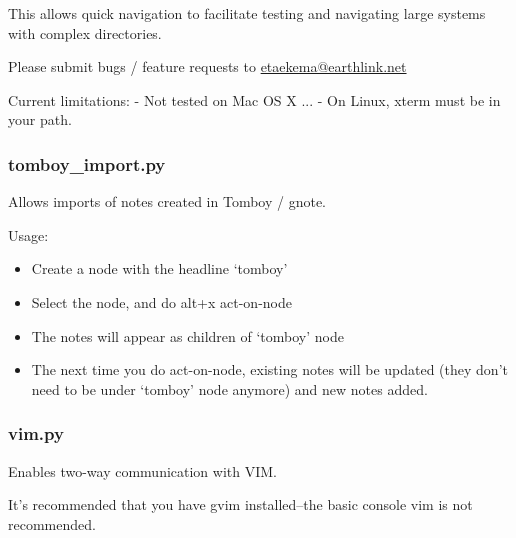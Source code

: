 \documentclass[a4paper,10pt,english]{sphinxmanual}
\begin{document}
This allows quick navigation to facilitate testing and navigating large systems
with complex directories.

Please submit bugs / feature requests to \href{mailto:etaekema@earthlink.net}{etaekema@earthlink.net}

Current limitations:
- Not tested on Mac OS X ...
- On Linux, xterm must be in your path.


\subsubsection{tomboy\_import.py}
\label{plugins:tomboy-import-py}
Allows imports of notes created in Tomboy / gnote.

Usage:
\begin{itemize}
\item {} 
Create a node with the headline `tomboy'

\item {} 
Select the node, and do alt+x act-on-node

\item {} 
The notes will appear as children of `tomboy' node

\item {} 
The next time you do act-on-node, existing notes will be updated (they don't need to
be under `tomboy' node anymore) and new notes added.

\end{itemize}


\subsubsection{vim.py}
\label{plugins:vim-py}
Enables two-way communication with VIM.

It's recommended that you have gvim installed--the basic console vim is not recommended.
\end{document}
